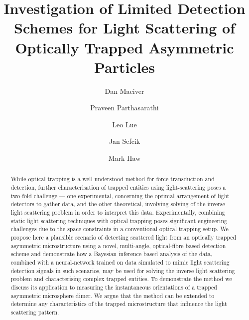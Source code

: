 \documentclass[final,  3p]{elsarticle}
\begin{document}
\begin{frontmatter}

\title{Investigation of Limited Detection Schemes for Light Scattering of Optically Trapped Asymmetric Particles}


\author[aff1]{Dan Maciver} 

\author[aff1]{Praveen Parthasarathi}

\author[aff1]{Leo Lue}

\author[aff1]{Jan Sefcik}

\author[aff1]{Mark Haw}






\begin{abstract}
  While optical trapping is a well understood method for force
  transduction and detection, further characterisation of trapped entities using light-scattering
  poses a two-fold challenge --- one experimental, concerning the optimal
  arrangement of light detectors to gather data, and the other theoretical, involving
  solving of the inverse light scattering problem in order to interpret this data. Experimentally, combining static
  light scattering techniques with optical trapping poses significant
  engineering challenges due to the space constraints in a
  conventional optical trapping setup.  We propose here a plausible
  scenario of detecting scattered light from an optically trapped
  asymmetric microstructure using a novel, multi-angle, optical-fibre
  based detection scheme and demonstrate how a Bayesian inference
  based analysis of the data, combined with a neural-network trained on data simulated to mimic light scattering
  detection signals in such scenarios, may be used for solving the
  inverse light scattering problem and characterising complex trapped
  entities.  To demonstrate the method we discuss its application to
  measuring the instantaneous orientations of a trapped asymmetric microsphere
  dimer. We argue that the method can be extended to
  determine any characteristics of the trapped microstructure that
  influence the light scattering pattern.
\end{abstract}


\end{frontmatter}
\end{document}
